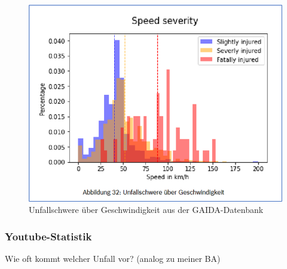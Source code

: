 \begin{figure}[H]
	\centering
	\includegraphics[width=\linewidth]{Bilder/SpeedSeverity.png}
	\caption{Unfallschwere über Geschwindigkeit aus der GAIDA-Datenbank\cite{Maire2020}}
	\label{fig:SpeedSeverity}
\end{figure}


%
%
%

\subsubsection{Youtube-Statistik}

Wie oft kommt welcher Unfall vor? (analog zu meiner BA)\\


